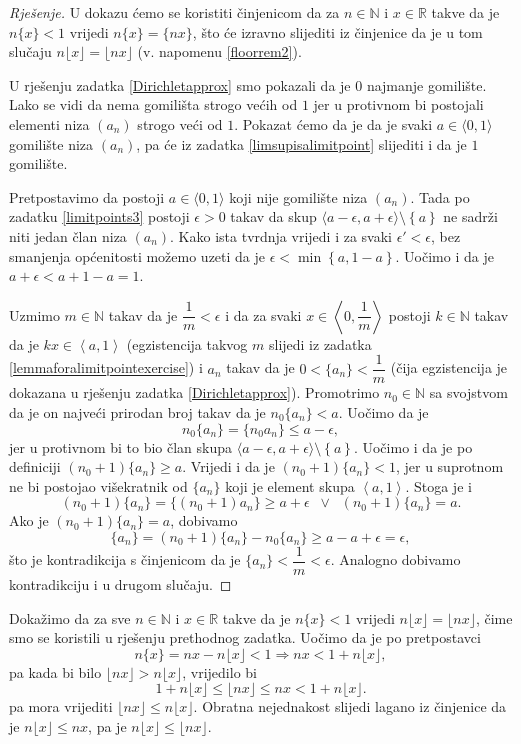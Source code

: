 \begin{proof}[Rješenje]
U dokazu ćemo se koristiti činjenicom da za $n\in \mathbb{N}$ i $x\in \mathbb{R}$ takve da je $n\{x\}<1$ vrijedi $n\{x\}=\{nx\}$, što će izravno slijediti iz činjenice da je u tom slučaju $n\lfloor x\rfloor= \lfloor nx\rfloor$ (v. napomenu \ref{floorrem2}).

U rješenju zadatka \ref{Dirichletapprox} smo pokazali da je $0$ najmanje gomilište. Lako se vidi da nema gomilišta strogo većih od $1$ jer u protivnom bi postojali elementi niza $(a_n)$ strogo veći od $1$. Pokazat ćemo da je da je svaki $a\in \langle 0, 1\rangle$ gomilište niza $(a_n)$, pa će iz zadatka \ref{limsupisalimitpoint} slijediti i da je $1$ gomilište. 

Pretpostavimo da postoji $a\in \langle 0, 1\rangle$ koji nije gomilište niza $(a_n)$. Tada po zadatku \ref{limitpoints3} postoji $\epsilon>0$ takav da skup $\langle a-\epsilon, a+\epsilon\rangle\setminus\left\{a\right\}$ ne sadrži niti jedan član niza $(a_n)$. Kako ista tvrdnja vrijedi i za svaki $\epsilon'<\epsilon$, bez smanjenja općenitosti možemo uzeti da je $\epsilon<\min{\left\{a, 1-a\right\}}$. Uočimo i da je $a+\epsilon<a+1-a=1.$ 

Uzmimo $m\in \mathbb{N}$ takav da je $\dfrac{1}{m}<\epsilon$ i da za svaki $x\in \left\langle 0, \dfrac{1}{m}\right\rangle$ postoji $k\in \mathbb{N}$ takav da je $kx\in \left\langle a, 1\right\rangle$ (egzistencija takvog $m$ slijedi iz zadatka \ref{lemmaforalimitpointexercise}) i $a_n$ takav da je $0<\{a_n\}<\dfrac{1}{m}$ (čija egzistencija je dokazana u rješenju zadatka \ref{Dirichletapprox}). Promotrimo $n_0\in \mathbb{N}$ sa svojstvom da je on najveći prirodan broj takav da je $n_0\{a_n\}<a$. Uočimo da je $$n_0\{a_n\}=\{n_0 a_n\}\leq a-\epsilon,$$
jer u protivnom bi to bio član skupa $\langle a-\epsilon, a+\epsilon\rangle\setminus\left\{a\right\}$. Uočimo i da je po definiciji $(n_0+1)\{a_n\}\geq a$. Vrijedi i da je $(n_0+1)\{a_n\}<1$, jer u suprotnom ne bi postojao višekratnik od $\{a_n\}$ koji je element skupa $\left\langle a, 1\right\rangle$. Stoga je i 
$$(n_0+1)\{a_n\}=\{(n_0+1)a_n\}\geq a+\epsilon\;\;\vee\;\; (n_0+1)\{a_n\}=a.$$
Ako je $(n_0+1)\{a_n\}=a$, dobivamo
$$\{a_n\}=(n_0+1)\{a_n\}-n_0\{a_n\}\geq a-a+\epsilon=\epsilon,$$
što je kontradikcija s činjenicom da je $\{a_n\}<\dfrac{1}{m}<\epsilon$. Analogno dobivamo kontradikciju i u drugom slučaju.
\end{proof}
\begin{remark}
\label{floorrem2}
Dokažimo da za sve $n\in \mathbb{N}$ i $x\in \mathbb{R}$ takve da je $n\{x\}<1$ vrijedi $n\lfloor x\rfloor= \lfloor nx\rfloor$, čime smo se koristili u rješenju prethodnog zadatka. Uočimo da je po pretpostavci
$$n\{x\}=nx-n\lfloor x\rfloor<1\Rightarrow nx<1+n\lfloor x\rfloor,$$
pa kada bi bilo $\lfloor nx\rfloor>n\lfloor x\rfloor$, vrijedilo bi
$$1+n\lfloor x\rfloor\leq \lfloor nx\rfloor\leq nx<1+n\lfloor x\rfloor.$$
pa mora vrijediti $\lfloor nx\rfloor\leq n\lfloor x\rfloor$. Obratna nejednakost slijedi lagano iz činjenice da je $n\lfloor x\rfloor\leq nx$, pa je $n\lfloor x\rfloor\leq \lfloor nx\rfloor$.
\end{remark}
\newpage

